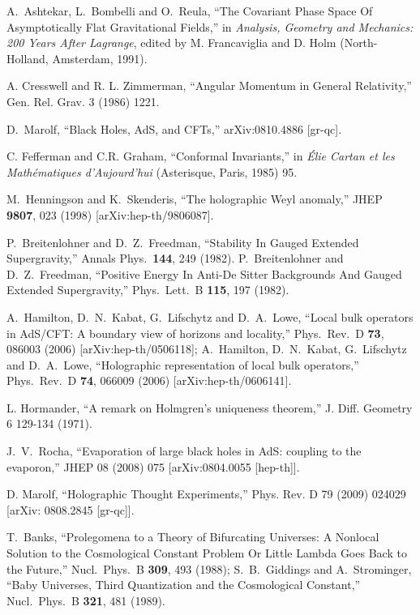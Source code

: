 \documentclass[12pt,onecolumn,eqsecnum,aps,prd,nofootinbib]{revtex4}
\begin{document}
\begin{thebibliography}{99}
 A.~Ashtekar, L.~Bombelli and O.~Reula, ``The Covariant Phase
Space Of Asymptotically Flat Gravitational Fields,'' in
\textit{Analysis, Geometry and Mechanics: 200 Years After Lagrange},
edited by M. Francaviglia and D. Holm (North-Holland, Amsterdam,
1991).

 A. Cresswell and R. L. Zimmerman, ``Angular Momentum in
General Relativity,'' Gen. Rel. Grav. 3 (1986) 1221.

  D.~Marolf,
  ``Black Holes, AdS, and CFTs,''
  arXiv:0810.4886 [gr-qc].


C. Fefferman and C.R. Graham, ``Conformal Invariants,'' in {\it \'Elie Cartan
et les Math\'ematiques d'Aujourd'hui} (Asterisque, Paris, 1985) 95.

M.~Henningson and K.~Skenderis,
  ``The holographic Weyl anomaly,''
  JHEP {\bf 9807}, 023 (1998)
  [arXiv:hep-th/9806087].

  P.~Breitenlohner and D.~Z.~Freedman,
  ``Stability In Gauged Extended Supergravity,''
  Annals Phys.\  {\bf 144}, 249 (1982).
  P.~Breitenlohner and D.~Z.~Freedman,
  ``Positive Energy In Anti-De Sitter Backgrounds And Gauged Extended
  Supergravity,''
  Phys.\ Lett.\  B {\bf 115}, 197 (1982).


 A.~Hamilton, D.~N.~Kabat, G.~Lifschytz and D.~A.~Lowe,
  ``Local bulk operators in AdS/CFT: A boundary view of horizons and
  locality,''
  Phys.\ Rev.\  D {\bf 73}, 086003 (2006)
  [arXiv:hep-th/0506118];
    A.~Hamilton, D.~N.~Kabat, G.~Lifschytz and D.~A.~Lowe,
  ``Holographic representation of local bulk operators,''
  Phys.\ Rev.\  D {\bf 74}, 066009 (2006)
  [arXiv:hep-th/0606141].

L. Hormander, ``A remark
on Holmgren's uniqueness theorem,'' J. Diff. Geometry 6 129-134 (1971).

 J.~V.~Rocha,
  ``Evaporation of large black holes in AdS: coupling to the evaporon,'' JHEP 08 (2008) 075
  [arXiv:0804.0055 [hep-th]].

 D. Marolf, ``Holographic Thought Experiments,'' Phys. Rev. D 79 (2009) 024029
 [arXiv: 0808.2845 [gr-qc]].

   T.~Banks,
  ``Prolegomena to a Theory of Bifurcating Universes: A Nonlocal Solution to
  the Cosmological Constant Problem Or Little Lambda Goes Back to the Future,''
  Nucl.\ Phys.\  B {\bf 309}, 493 (1988);
  S.~B.~Giddings and A.~Strominger,
  ``Baby Universes, Third Quantization and the Cosmological Constant,''
  Nucl.\ Phys.\  B {\bf 321}, 481 (1989).


\end{thebibliography}
\end{document}
